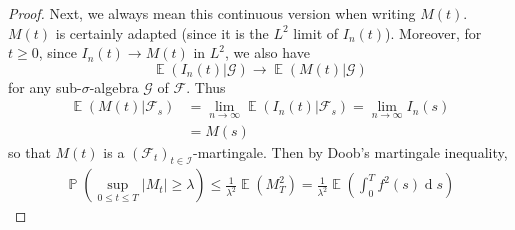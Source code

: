 \documentclass[11pt, a4paper]{memoir}
\theoremstyle{change}
\theoremstyle{plain}
\theoremstyle{nonumberplain}
\newtheorem{proof}{Proof}
\DeclareMathOperator{\pr}{{\mathbb{P}}}
\DeclareMathOperator{\E}{{\mathbb{E}}}
\renewcommand{\d}[1]{\ensuremath{\operatorname{d}\!{#1}}}
\numberwithin{equation}{section}
\begin{document}
\begin{proof}
    Next, we always mean this continuous version when writing $M(t)$.
    $M(t)$ is certainly adapted (since it is the $L^2$ limit of $I_n(t)$).
    Moreover, for $t\geq 0$, since $I_n(t)\to M(t)$ in $L^2$, we also have
    \begin{equation*}
        \E(I_n(t)|\mathcal{G})\to \E(M(t)|\mathcal{G})
    \end{equation*}
    for any sub-$\sigma$-algebra $\mathcal{G}$ of $\mathcal{F}$.
    Thus
    \begin{align*}
        \E(M(t)|\mathcal{F}_s)&= \lim_{n\to\infty}\E(I_n(t)|\mathcal{F}_s)=\lim_{n\to\infty}I_n(s)\\
                              &= M(s)
    \end{align*}
    so that $M(t)$ is a $(\mathcal{F}_t)_{t\in \mathcal{I}}$-martingale.
    Then by Doob's martingale inequality,
    \begin{align*}
        \pr(\sup_{0\leq t\leq T}|M_t|\geq\lambda)\leq\frac{1}{\lambda^2}\E(M_T^2)=\frac{1}{\lambda^2}\E(\int_0^Tf^2(s)\d{s})
    \end{align*}
\end{proof}
\end{document}
